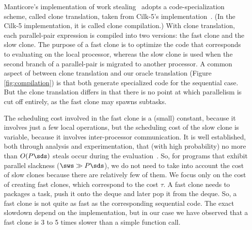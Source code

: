 Manticore's implementation of work stealing~\cite{rainey:phd} adopts a
code-specialization scheme, called clone translation, taken from Cilk-5's
implementation~\cite{FrigoLeRa98}. (In the Cilk-5
implementation, it is called clone compilation.) With clone
translation, each parallel-pair expression is compiled into two
versions: the fast clone and the slow clone. 
The purpose of a fast clone is to optimize the code that corresponds
to evaluating on the local processor,
whereas the slow clone is used when the second branch 
of a parallel-pair is migrated to another processor.
A common aspect of between clone translation and our oracle
translation (Figure \ref{fig:compilation}) is that both generate
specialized code for the sequential case. But the clone translation
differs in that there is no point at which parallelism is cut off
entirely, as the fast clone may spawns subtasks.

The scheduling cost involved in the fast clone is a (small) constant,
because it involves just a few local operations, but the scheduling
cost of the slow clone is variable, because it involves
inter-processor communication. 
It is well established, both through analysis and
experimentation, that (with high probability)
no more than $O(P\sds)$ steals occur during 
the evaluation~\cite{BlumofeWorkStealing}.
So, for programs that exhibit parallel slackness ($\sws \gg P \sds $),
we do not need to take into account the cost of slow clones
because there are relatively few of them.
We focus only on the cost of creating fast clones,
which correspond to the cost $\tau$.
A fast clone needs to packages a task, push it onto the deque
and later pop it from the deque. So, a fast clone is not quite
as fast as the corresponding sequential code.
The exact slowdown depend on the implementation, but in our
case we have observed that a fast clone is 3 to 5 
times slower than a simple function call.



